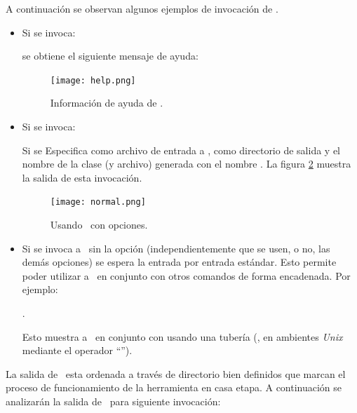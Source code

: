 A continuación se observan algunos ejemplos de invocación de \maggen.
\begin{itemize}
\item Si se invoca:
\begin{center}{}\end{center} se obtiene el siguiente mensaje de ayuda:

\begin{figure}[!ht]\centering
\texttt{[image: help.png]}
\caption{\label{fig:outhelp} Información de ayuda de \maggen.}
\end{figure}

\item Si se invoca:  \begin{center}
{\scriptsize{}}                                                                                                                                   \end{center} Si se Especifica como archivo de entrada a , como directorio de salida  y el nombre de la clase (y archivo) generada con el nombre . La figura \ref{fig:outnormal} muestra la salida de esta invocación.

\begin{figure}[!ht]\centering
\texttt{[image: normal.png]}
\caption{\label{fig:outnormal} Usando \maggen\ con opciones.}
\end{figure}

\item Si se invoca a \maggen\ sin la opción  (independientemente que se usen, o no, las demás opciones) se espera la entrada por entrada estándar. Esto permite poder utilizar a \maggen\ en conjunto con otros comandos de forma encadenada. Por ejemplo:

\begin{center}.\end{center}

Esto muestra a \maggen\ en conjunto con  usando una tubería (, en ambientes \textit{Unix} mediante el operador ``\textbtt{|}'').

\end{itemize}

La salida de \maggen\ esta ordenada a través de directorio bien definidos que marcan el proceso de funcionamiento de la herramienta en casa etapa. A continuación se analizarán la salida de \maggen\ para siguiente invocación:

